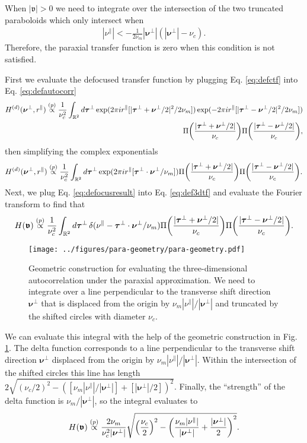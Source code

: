 \documentclass[]{osa-article}
\let\originalleft\left
\let\originalright\right
\renewcommand{\left}{\mathopen{}\mathclose\bgroup\originalleft}
\renewcommand{\right}{\aftergroup\egroup\originalright}
\newcommand{\mypar}{\parallel}
\providecommand{\mbb}[1]{\mathbb{#1}}
\providecommand{\bs}[1]{\boldsymbol{#1}}
\providecommand{\bv}{\boldsymbol{\mathfrak{v}}}
\providecommand{\bvperp}{\bs{\nu}^{\bot}}
\providecommand{\bvpar}{\nu^{\parallel}}
\providecommand{\btperp}{\bs{\tau}^{\bot}}
\providecommand{\propp}{\stackrel{(p)}{\propto}}
\begin{document}
When $|\bv| > 0$ we need to integrate over the intersection of the two truncated paraboloids which only intersect when
\begin{align}
  |\bvpar| < -\frac{1}{2\nu_m}|\bvperp|(|\bvperp| - \nu_c). 
\end{align}
Therefore, the paraxial transfer function is zero when this condition is not satisfied.

First we evaluate the defocused transfer function by plugging Eq. \eqref{eq:defctf} into Eq. \eqref{eq:defautocorr}
\begin{align}
  H^{(d)}(\bvperp,r^{\mypar}) \propp \frac{1}{\nu_c^2}\int_{\mbb{R}^2}d\btperp\, \text{exp}(2\pi i r^{\mypar}[|\btperp + \bvperp/2|^2/2\nu_m])\, \text{exp}(-2\pi i r^{\mypar}[|\btperp - \bvperp/2|^2/2\nu_m])\nonumber\\\Pi\left(\frac{|\btperp + \bvperp/2|}{\nu_c}\right) \Pi\left(\frac{|\btperp - \bvperp/2|}{\nu_c}\right),
\end{align}
then simplifying the complex exponentials
\begin{align}
  H^{(d)}(\bvperp,r^{\mypar}) \propp \frac{1}{\nu_c^2}\int_{\mbb{R}^2}d\btperp\, \text{exp}(2\pi i r^{\mypar}[\btperp\cdot\bvperp/\nu_m])\Pi\left(\frac{|\btperp + \bvperp/2|}{\nu_c}\right) \Pi\left(\frac{|\btperp - \bvperp/2|}{\nu_c}\right).\label{eq:defocusresult}
\end{align}
Next, we plug Eq. \eqref{eq:defocusresult} into Eq. \eqref{eq:def3dtf} and evaluate the
Fourier transform to find that 
\begin{align}
  H(\bv) \propp \frac{1}{\nu_c^2}\int_{\mbb{R}^2}d\btperp\, \delta(\bvpar - \btperp\cdot\bvperp/\nu_m)\Pi\left(\frac{|\btperp + \bvperp/2|}{\nu_c}\right) \Pi\left(\frac{|\btperp - \bvperp/2|}{\nu_c}\right).
\end{align}
\begin{figure}
  \centering
  \texttt{[image: ../figures/para-geometry/para-geometry.pdf]}
  \caption{Geometric construction for evaluating the three-dimensional autocorrelation under the paraxial approximation. We need to integrate over a line perpendicular to the transverse shift direction $\bvperp$ that is displaced from the origin by $\nu_m|\bvpar|/|\bvperp|$ and truncated by the shifted circles with diameter $\nu_c$.}
  \label{fig:geometry}
\end{figure}

We can evaluate this integral with the help of the geometric construction in Fig. \ref{fig:geometry}. The delta function corresponds to a line perpendicular to the transverse shift direction $\bvperp$ displaced from the origin by $\nu_m|\bvpar|/|\bvperp|$. Within the intersection of the shifted circles this line has length $2\sqrt{(\nu_c/2)^2 - ([\nu_m|\bvpar|/|\bvperp|] + [|\bvperp|/2])^2}$. Finally, the ``strength'' of the delta function is $\nu_m/|\bvperp|$, so the integral evaluates to 
\begin{align}
  H(\bv) \propp \frac{2\nu_m}{\nu_c^2|\bvperp|}\sqrt{\left(\frac{\nu_c}{2}\right)^2 - \left(\frac{\nu_m|\bvpar|}{|\bvperp|} + \frac{|\bvperp|}{2}\right)^2}. 
\end{align}
\end{document}
